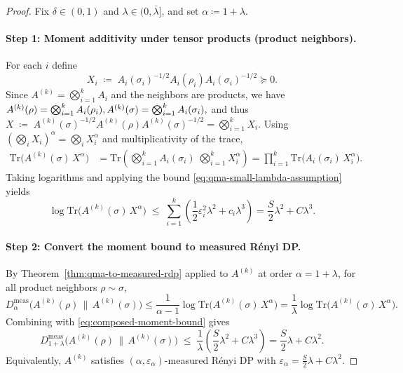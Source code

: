 \documentclass[11pt]{article}
\def\Tr{\mathrm{Tr}}
\theoremstyle{plain}
\theoremstyle{remark}
\begin{document}
\begin{proof}
Fix $\delta\in(0,1)$ and $\lambda\in(0,\bar\lambda]$, and set $\alpha\coloneqq1+\lambda$.

\paragraph{Step 1: Moment additivity under tensor products (product neighbors).}
For each $i$ define
\[
X_i \;\coloneqq\; A_i(\sigma_i)^{-1/2}A_i(\rho_i)A_i(\sigma_i)^{-1/2}\succeq 0.
\]
Since $A^{(k)}= \bigotimes_{i=1}^k A_i$ and the neighbors are products, we have
$
A^{(k)}(\rho)=\bigotimes_{i=1}^k A_i(\rho_i),
\\
A^{(k)}(\sigma)=\bigotimes_{i=1}^k A_i(\sigma_i),
$
and thus
$
X \;\coloneqq\; A^{(k)}(\sigma)^{-1/2}A^{(k)}(\rho)A^{(k)}(\sigma)^{-1/2}
=\bigotimes_{i=1}^k X_i.
$
Using $(\bigotimes_i X_i)^{\alpha}=\bigotimes_i X_i^{\alpha}$ and multiplicativity of the trace,
\begin{align}
\Tr\!\big(A^{(k)}(\sigma)\,X^{\alpha}\big)
&=
\Tr\!\left(\bigotimes_{i=1}^k A_i(\sigma_i)\;\bigotimes_{i=1}^k X_i^{\alpha}\right) =
\prod_{i=1}^k \Tr\!\big(A_i(\sigma_i)\,X_i^{\alpha}\big).
\end{align}
Taking logarithms and applying the bound \eqref{eq:qma-small-lambda-assumption} yields
\begin{equation}
\label{eq:composed-moment-bound}
\log \Tr\!\big(A^{(k)}(\sigma)\,X^{\alpha}\big)
\;\le\;
\sum_{i=1}^k \left(\frac{1}{2}\varepsilon_i^2\lambda^2 + c_i\lambda^3\right)
=
\frac{S}{2}\lambda^2 + C\lambda^3.
\end{equation}

\paragraph{Step 2: Convert the moment bound to measured R\'enyi DP.}
By Theorem~\ref{thm:qma-to-measured-rdp} applied to $A^{(k)}$ at order $\alpha=1+\lambda$,
for all product neighbors $\rho\sim\sigma$,
\[
D^{\mathrm{meas}}_{\alpha}\!\big(A^{(k)}(\rho)\,\|\,A^{(k)}(\sigma)\big)
\le
\frac{1}{\alpha-1}\log \Tr\!\big(A^{(k)}(\sigma)\,X^{\alpha}\big)
=
\frac{1}{\lambda}\log \Tr\!\big(A^{(k)}(\sigma)\,X^{\alpha}\big).
\]
Combining with \eqref{eq:composed-moment-bound} gives
\begin{equation}
\label{eq:measured-rdp-eps}
D^{\mathrm{meas}}_{1+\lambda}\!\big(A^{(k)}(\rho)\,\|\,A^{(k)}(\sigma)\big)
\;\le\;
\frac{1}{\lambda}\left(\frac{S}{2}\lambda^2 + C\lambda^3\right)
=
\frac{S}{2}\lambda + C\lambda^2.
\end{equation}
Equivalently, $A^{(k)}$ satisfies $(\alpha,\varepsilon_\alpha)$-measured R\'enyi DP with
$\varepsilon_\alpha=\frac{S}{2}\lambda + C\lambda^2$.


\end{proof}
\end{document}
